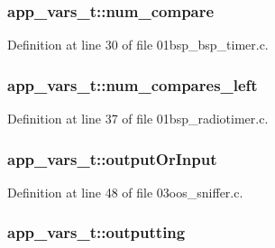 \subsubsection[{\texorpdfstring{num\+\_\+compare}{num_compare}}]{ app\+\_\+vars\+\_\+t\+::num\+\_\+compare}\hypertarget{structapp__vars__t_a26afb2869274446da1b06398cafc5733}{}\label{structapp__vars__t_a26afb2869274446da1b06398cafc5733}


Definition at line 30 of file 01bsp\+\_\+bsp\+\_\+timer.\+c.

\subsubsection[{\texorpdfstring{num\+\_\+compares\+\_\+left}{num_compares_left}}]{ app\+\_\+vars\+\_\+t\+::num\+\_\+compares\+\_\+left}\hypertarget{structapp__vars__t_adce7c091ae691efec1be1dd25ec5939b}{}\label{structapp__vars__t_adce7c091ae691efec1be1dd25ec5939b}


Definition at line 37 of file 01bsp\+\_\+radiotimer.\+c.

\subsubsection[{\texorpdfstring{output\+Or\+Input}{outputOrInput}}]{ app\+\_\+vars\+\_\+t\+::output\+Or\+Input}\hypertarget{structapp__vars__t_a3d3b3db17b7aaf0722962d7bf4c9cedd}{}\label{structapp__vars__t_a3d3b3db17b7aaf0722962d7bf4c9cedd}


Definition at line 48 of file 03oos\+\_\+sniffer.\+c.

\subsubsection[{\texorpdfstring{outputting}{outputting}}]{ app\+\_\+vars\+\_\+t\+::outputting}\hypertarget{structapp__vars__t_a32239d1c23c16467c8e4206891b0caa4}{}\label{structapp__vars__t_a32239d1c23c16467c8e4206891b0caa4}


